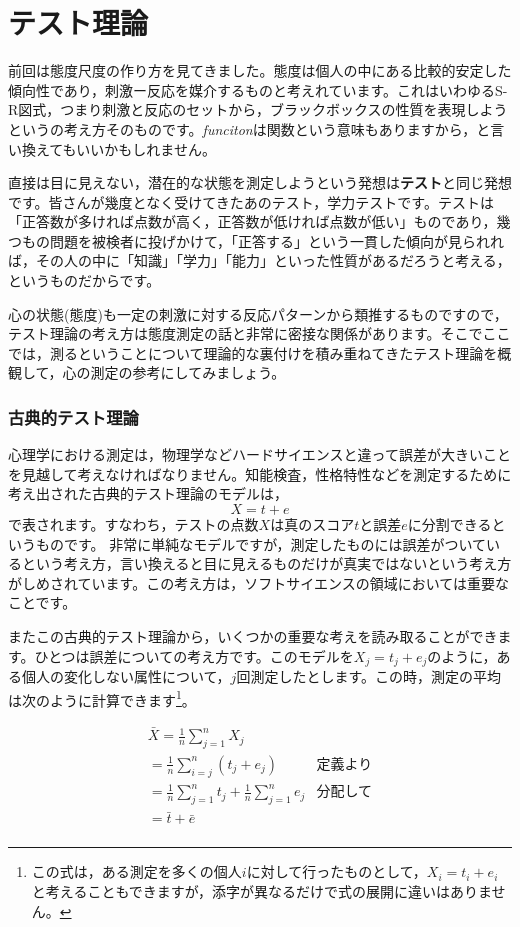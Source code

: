 \documentclass{ltjsbook}
\begin{document}
\chapter{テスト理論}
\label{H02_TestTheory}
前回は態度尺度の作り方を見てきました。態度は個人の中にある比較的安定した傾向性であり，刺激ー反応を媒介するものと考えれています。これはいわゆるS-R図式，つまり刺激と反応のセットから，ブラックボックスの性質を表現しようというの考え方そのものです。\textit{funciton}は関数という意味もありますから，と言い換えてもいいかもしれません。

直接は目に見えない，潜在的な状態を測定しようという発想は\textbf{テスト}と同じ発想です。皆さんが幾度となく受けてきたあのテスト，学力テストです。テストは「正答数が多ければ点数が高く，正答数が低ければ点数が低い」ものであり，幾つもの問題を被検者に投げかけて，「正答する」という一貫した傾向が見られれば，その人の中に「知識」「学力」「能力」といった性質があるだろうと考える，というものだからです。

心の状態(態度)も一定の刺激に対する反応パターンから類推するものですので，テスト理論の考え方は態度測定の話と非常に密接な関係があります。そこでここでは，測るということについて理論的な裏付けを積み重ねてきたテスト理論を概観して，心の測定の参考にしてみましょう。

\subsection{古典的テスト理論}
心理学における測定は，物理学などハードサイエンスと違って誤差が大きいことを見越して考えなければなりません。知能検査，性格特性などを測定するために考え出された古典的テスト理論のモデルは，
\[X=t+e\]
で表されます。すなわち，テストの点数$X$は真のスコア$t$と誤差$e$に分割できるというものです。
非常に単純なモデルですが，測定したものには誤差がついているという考え方，言い換えると目に見えるものだけが真実ではないという考え方がしめされています。この考え方は，ソフトサイエンスの領域においては重要なことです。

またこの古典的テスト理論から，いくつかの重要な考えを読み取ることができます。ひとつは誤差についての考え方です。このモデルを$X_j = t_j + e_j$のように，ある個人の変化しない属性について，$j$回測定したとします。この時，測定の平均は次のように計算できます\footnote{この式は，ある測定を多くの個人$i$に対して行ったものとして，$X_i = t_i + e_i$と考えることもできますが，添字が異なるだけで式の展開に違いはありません。}。

\begin{align*}
	 & \bar{X}  =  \frac{1}{n}\sum_{j=1}^n X_j                           &             & \mbox{} \\
	 & =  \frac{1}{n}\sum_{i=j}^n (t_j + e_j)                            & \mbox{定義より}           \\
	 & =  \frac{1}{n} \sum_{j=1}^n  t_j +  \frac{1}{n} \sum_{j=1}^n  e_j & \mbox{分配して}           \\
	 & =  \bar{t} + \bar{e}                                              & \mbox{}               \\
\end{align*}
\end{document}
